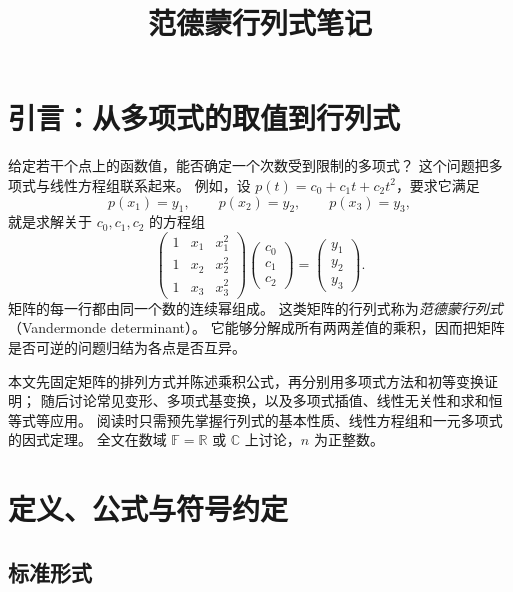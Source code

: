 \documentclass[UTF8,12pt,a4paper,fontset=fandol]{ctexart}
\title{范德蒙行列式笔记}
\author{}
\date{}
\begin{document}
\maketitle
\tableofcontents

\section{引言：从多项式的取值到行列式}

给定若干个点上的函数值，能否确定一个次数受到限制的多项式？
这个问题把多项式与线性方程组联系起来。
例如，设 $p(t)=c_0+c_1t+c_2t^2$，要求它满足
\[
  p(x_1)=y_1,\qquad p(x_2)=y_2,\qquad p(x_3)=y_3,
\]
就是求解关于 $c_0,c_1,c_2$ 的方程组
\[
  \begin{pmatrix}
    1&x_1&x_1^2\\
    1&x_2&x_2^2\\
    1&x_3&x_3^2
  \end{pmatrix}
  \begin{pmatrix}c_0\\c_1\\c_2\end{pmatrix}
  =\begin{pmatrix}y_1\\y_2\\y_3\end{pmatrix}.
\]
矩阵的每一行都由同一个数的连续幂组成。
这类矩阵的行列式称为\emph{范德蒙行列式}（Vandermonde determinant）。
它能够分解成所有两两差值的乘积，因而把矩阵是否可逆的问题归结为各点是否互异。

本文先固定矩阵的排列方式并陈述乘积公式，再分别用多项式方法和初等变换证明；
随后讨论常见变形、多项式基变换，以及多项式插值、线性无关性和求和恒等式等应用。
阅读时只需预先掌握行列式的基本性质、线性方程组和一元多项式的因式定理。
全文在数域 $\mathbb F=\mathbb R$ 或 $\mathbb C$ 上讨论，$n$ 为正整数。

\section{定义、公式与符号约定}

\subsection{标准形式}
\end{document}
